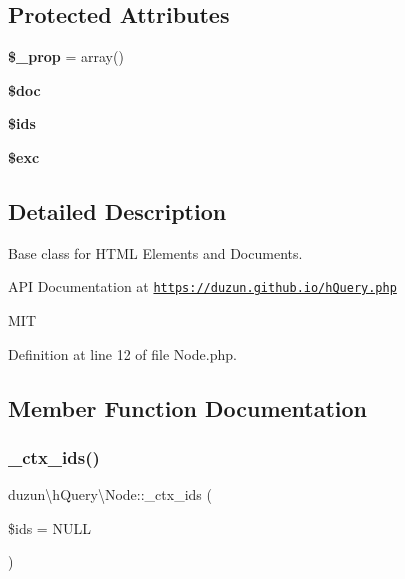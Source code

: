 \subsection*{Protected Attributes}
\begin{DoxyCompactItemize}
\item 
\mbox{\label{classduzun_1_1hQuery_1_1Node_a7364e71ee9e2352d7d5b6d5d09fb5f1e}} 
{\bfseries \$\+\_\+prop} = array()
\item 
\mbox{\label{classduzun_1_1hQuery_1_1Node_a81eeba47b20b3c4070c9823a3db24519}} 
{\bfseries \$doc}
\item 
\mbox{\label{classduzun_1_1hQuery_1_1Node_aa84e29b3422dc9521e7a38ff0ac1657d}} 
{\bfseries \$ids}
\item 
\mbox{\label{classduzun_1_1hQuery_1_1Node_a3daf8fc1d60770e6baeb91989f7599ee}} 
{\bfseries \$exc}
\end{DoxyCompactItemize}


\subsection{Detailed Description}
Base class for H\+T\+ML Elements and Documents.

A\+PI Documentation at \href{https://duzun.github.io/hQuery.php}{\tt https\+://duzun.\+github.\+io/h\+Query.\+php}

M\+IT 

Definition at line 12 of file Node.\+php.



\subsection{Member Function Documentation}
\mbox{\label{classduzun_1_1hQuery_1_1Node_aec6b6185b6dfc245eca4364aa71000d1}} 
\subsubsection{\texorpdfstring{\+\_\+ctx\+\_\+ids()}{\_ctx\_ids()}}
{\footnotesize\ttfamily duzun\textbackslash{}h\+Query\textbackslash{}\+Node\+::\+\_\+ctx\+\_\+ids (\begin{DoxyParamCaption}\item[{}]{\$ids = {\ttfamily NULL} }\end{DoxyParamCaption})\hspace{0.3cm}{\ttfamily [protected]}}


